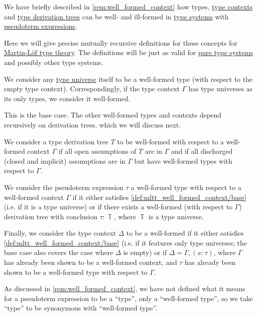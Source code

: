\begin{definition}\label{def:mltt_well_formed_context}\mimprovised
  We have briefly described in \cref{rem:well_formed_context} how types, \hyperref[def:type_context]{type contexts} and \hyperref[def:type_derivation_tree]{type derivation trees} can be well- and ill-formed in \hyperref[def:abstract_type_system]{type systems} with \hyperref[con:pseudoterm_expression]{pseudoterm expressions}.

  Here we will give precise mutually recursive definitions for these concepts for \hyperref[def:mltt]{Martin-L\"of type theory}. The definitions will be just as valid for \hyperref[def:pure_type_system]{pure type systems} and possibly other type systems.

  \begin{thmenum}
     We consider any \hyperref[con:type_universe]{type universe} itself to be a well-formed type (with respect to the empty type context). Correspondingly, if the type context \( \Gamma \) has type universes as its only types, we consider it well-formed.

    This is the base case. The other well-formed types and contexts depend recursively on derivation trees, which we will discuss next.

     We consider a type derivation tree \( T \) to be well-formed with respect to a well-formed context \( \Gamma \) if all open assumptions of \( T \) are in \( \Gamma \) and if all discharged (closed and implicit) assumptions are  in \( \Gamma \) but have well-formed types with respect to \( \Gamma \).

     We consider the pseudoterm expression \( \tau \) a well-formed type with respect to a well-formed context \( \Gamma \) if it either satisfies \cref{def:mltt_well_formed_context/base} (i.e. if it is a type universe) or if there exists a well-formed (with respect to \( \Gamma \)) derivation tree with conclusion \( \tau: \BbbT \), where \( \BbbT \) is a type universe.

     Finally, we consider the type context \( \Delta \) to be a well-formed if it either satisfies \cref{def:mltt_well_formed_context/base} (i.e. if it features only type universes; the base case also covers the case where \( \Delta \) is empty) or if \( \Delta = \Gamma, (x: \tau) \), where \( \Gamma \) has already been shown to be a well-formed context, and \( \tau \) has already been shown to be a well-formed type with respect to \( \Gamma \).
  \end{thmenum}
\end{definition}
\begin{comments}
  \item As discussed in \cref{rem:well_formed_context}, we have not defined what it means for a pseudoterm expression to be a \enquote{type}, only a \enquote{well-formed type}, so we take \enquote{type} to be synonymous with \enquote{well-formed type}.
\end{comments}

